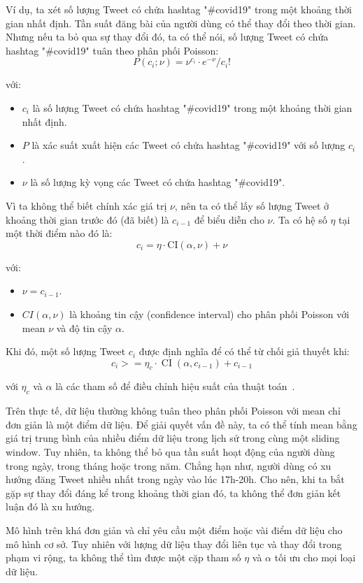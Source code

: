 Ví dụ, ta xét số lượng Tweet có chứa hashtag "\#covid19" trong một khoảng thời
gian nhất định. Tần suất đăng bài của người dùng có thể thay đổi theo thời
gian. Nhưng nếu ta bỏ qua sự thay đổi đó, ta có thể nói, số lượng Tweet có chứa
hashtag "\#covid19" tuân theo phân phối Poisson:
\[ P\left(c_{i} ; \nu\right)=\nu^{c_{i}} \cdot e^{-\nu} / c_{i} ! \]

với:
\begin{itemize}
	\item $c_{i}$ là số lượng Tweet có chứa hashtag "\#covid19" trong một khoảng
	thời gian nhất định.
	\item $P$ là xác suất xuất hiện các Tweet có chứa hashtag "\#covid19" với số
	lượng $c_{i}$.
	\item $\nu$ là số lượng kỳ vọng các Tweet có chứa hashtag "\#covid19".
\end{itemize}

Vì ta không thể biết chính xác giá trị $\nu$, nên ta có thể lấy số lượng Tweet ở
khoảng thời gian trước đó (đã biết) là $c_{i - 1}$ để biểu diễn cho $\nu$. Ta có
hệ số $\eta$ tại một thời điểm nào đó là:
\[ c_{i}=\eta \cdot \mathrm{CI}(\alpha, \nu)+\nu \]

với:
\begin{itemize}
	\item $\nu=c_{i-1}$.
	\item $CI(\alpha, \nu)$ là khoảng tin cậy (confidence interval) cho phân
	phối Poisson với mean $\nu$ và độ tin cậy $\alpha$.
\end{itemize}

Khi đó, một số lượng Tweet $c_{i}$ được định nghĩa để có thể từ chối giả thuyết
khi:
\[
	c_{i}>=\eta_{c} \cdot \operatorname{CI}\left(\alpha, c_{i-1}\right)+c_{i-1}
\]

với $\eta_{c}$ và $\alpha$ là các tham số để điều chỉnh hiệu suất của thuật
toán~\cite{hendricksonTrendDetectionSocial2015}.

Trên thực tế, dữ liệu thường không tuân theo phân phối Poisson với mean chỉ đơn
giản là một điểm dữ liệu. Để giải quyết vấn đề này, ta có thể tính mean bằng
giá trị trung bình của nhiều điểm dữ liệu trong lịch sử trong cùng một sliding
window. Tuy nhiên, ta không thể bỏ qua tần suất hoạt động của người dùng trong
ngày, trong tháng hoặc trong năm. Chẳng hạn như, người dùng có xu hướng đăng
Tweet nhiều nhất trong ngày vào lúc 17h-20h. Cho nên, khi ta bắt gặp sự thay
đổi đáng kể trong khoảng thời gian đó, ta không thể đơn giản kết luận đó là xu
hướng.

Mô hình trên khá đơn giản và chỉ yêu cầu một điểm hoặc vài điểm dữ liệu cho mô
hình cơ sở. Tuy nhiên với lượng dữ liệu thay đổi liên tục và thay đổi trong
phạm vi rộng, ta không thể tìm được một cặp tham số $\eta$ và $\alpha$ tối ưu
cho mọi loại dữ liệu.


